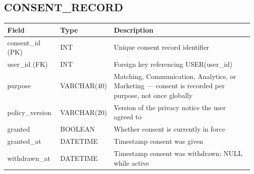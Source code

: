 \documentclass[12pt,a4paper]{report}
\begin{document}
\subsection*{CONSENT\_RECORD}
\begin{longtable}{L{3.2cm}L{2.5cm}L{8.5cm}}
\toprule
\textbf{Field} & \textbf{Type} & \textbf{Description} \\
\midrule
\endhead
consent\_id (PK) & INT & Unique consent record identifier \\
user\_id (FK) & INT & Foreign key referencing USER(user\_id) \\
purpose & VARCHAR(40) & Matching, Communication, Analytics, or Marketing --- consent is recorded per purpose, not once globally \\
policy\_version & VARCHAR(20) & Version of the privacy notice the user agreed to \\
granted & BOOLEAN & Whether consent is currently in force \\
granted\_at & DATETIME & Timestamp consent was given \\
withdrawn\_at & DATETIME & Timestamp consent was withdrawn; NULL while active \\
\bottomrule
\end{longtable}
\end{document}
